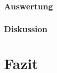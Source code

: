 \documentclass[12pt,a4paper]{article}
\begin{document}
\subsubsection*{Auswertung}

\subsubsection*{Diskussion}



\section{Fazit}
\end{document}
